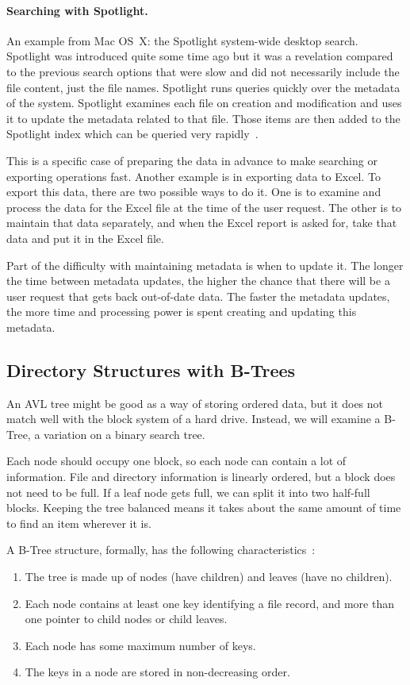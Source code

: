 \paragraph{Searching with Spotlight.}
An example from Mac OS~X: the Spotlight system-wide desktop search. Spotlight was introduced quite some time ago but it was a revelation compared to the previous search options that were slow and did not necessarily include the file content, just the file names. Spotlight runs queries quickly over the metadata of the system. Spotlight examines each file on creation and modification and uses it to update the metadata related to that file. Those items are then added to the Spotlight index which can be queried very rapidly~\cite{spotlight}.

This is a specific case of preparing the data in advance to make searching or exporting operations fast. Another example is in exporting data to Excel. To export this data, there are two possible ways to do it. One is to examine and process the data for the Excel file at the time of the user request. The other is to maintain that data separately, and when the Excel report is asked for, take that data and put it in the Excel file.

Part of the difficulty with maintaining metadata is when to update it. The longer the time between metadata updates, the higher the chance that there will be a user request that gets back out-of-date data. The faster the metadata updates, the more time and processing power is spent creating and updating this metadata.

\subsection*{Directory Structures with B-Trees}
An AVL tree might be good as a way of storing ordered data, but it does not match well with the block system of a hard drive. Instead, we will examine a B-Tree, a variation on a binary search tree. 

Each node should occupy one block, so each node can contain a lot of information. File and directory information is linearly ordered, but a block does not need to be full. If a leaf node gets full, we can split it into two half-full blocks. Keeping the tree balanced means it takes about the same amount of time to find an item wherever it is.

A B-Tree structure, formally, has the following characteristics~\cite{osi}:

\begin{enumerate}
	\item The tree is made up of nodes (have children) and leaves (have no children).
	\item Each node contains at least one key identifying a file record, and more than one pointer to child nodes or child leaves.
	\item Each node has some maximum number of keys.
	\item The keys in a node are stored in non-decreasing order.
\end{enumerate}

